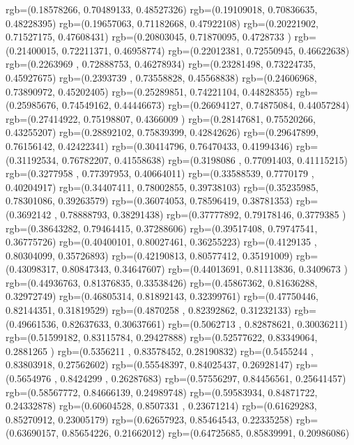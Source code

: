 {{{		  rgb=(0.18578266,  0.70489133,  0.48527326)
		  rgb=(0.19109018,  0.70836635,  0.48228395)
		  rgb=(0.19657063,  0.71182668,  0.47922108)
		  rgb=(0.20221902,  0.71527175,  0.47608431)
		  rgb=(0.20803045,  0.71870095,  0.4728733 )
		  rgb=(0.21400015,  0.72211371,  0.46958774)
		  rgb=(0.22012381,  0.72550945,  0.46622638)
		  rgb=(0.2263969 ,  0.72888753,  0.46278934)
		  rgb=(0.23281498,  0.73224735,  0.45927675)
		  rgb=(0.2393739 ,  0.73558828,  0.45568838)
		  rgb=(0.24606968,  0.73890972,  0.45202405)
		  rgb=(0.25289851,  0.74221104,  0.44828355)
		  rgb=(0.25985676,  0.74549162,  0.44446673)
		  rgb=(0.26694127,  0.74875084,  0.44057284)
		  rgb=(0.27414922,  0.75198807,  0.4366009 )
		  rgb=(0.28147681,  0.75520266,  0.43255207)
		  rgb=(0.28892102,  0.75839399,  0.42842626)
		  rgb=(0.29647899,  0.76156142,  0.42422341)
		  rgb=(0.30414796,  0.76470433,  0.41994346)
		  rgb=(0.31192534,  0.76782207,  0.41558638)
		  rgb=(0.3198086 ,  0.77091403,  0.41115215)
		  rgb=(0.3277958 ,  0.77397953,  0.40664011)
		  rgb=(0.33588539,  0.7770179 ,  0.40204917)
		  rgb=(0.34407411,  0.78002855,  0.39738103)
		  rgb=(0.35235985,  0.78301086,  0.39263579)
		  rgb=(0.36074053,  0.78596419,  0.38781353)
		  rgb=(0.3692142 ,  0.78888793,  0.38291438)
		  rgb=(0.37777892,  0.79178146,  0.3779385 )
		  rgb=(0.38643282,  0.79464415,  0.37288606)
		  rgb=(0.39517408,  0.79747541,  0.36775726)
		  rgb=(0.40400101,  0.80027461,  0.36255223)
		  rgb=(0.4129135 ,  0.80304099,  0.35726893)
		  rgb=(0.42190813,  0.80577412,  0.35191009)
		  rgb=(0.43098317,  0.80847343,  0.34647607)
		  rgb=(0.44013691,  0.81113836,  0.3409673 )
		  rgb=(0.44936763,  0.81376835,  0.33538426)
		  rgb=(0.45867362,  0.81636288,  0.32972749)
		  rgb=(0.46805314,  0.81892143,  0.32399761)
		  rgb=(0.47750446,  0.82144351,  0.31819529)
		  rgb=(0.4870258 ,  0.82392862,  0.31232133)
		  rgb=(0.49661536,  0.82637633,  0.30637661)
		  rgb=(0.5062713 ,  0.82878621,  0.30036211)
		  rgb=(0.51599182,  0.83115784,  0.29427888)
		  rgb=(0.52577622,  0.83349064,  0.2881265 )
		  rgb=(0.5356211 ,  0.83578452,  0.28190832)
		  rgb=(0.5455244 ,  0.83803918,  0.27562602)
		  rgb=(0.55548397,  0.84025437,  0.26928147)
		  rgb=(0.5654976 ,  0.8424299 ,  0.26287683)
		  rgb=(0.57556297,  0.84456561,  0.25641457)
		  rgb=(0.58567772,  0.84666139,  0.24989748)
		  rgb=(0.59583934,  0.84871722,  0.24332878)
		  rgb=(0.60604528,  0.8507331 ,  0.23671214)
		  rgb=(0.61629283,  0.85270912,  0.23005179)
		  rgb=(0.62657923,  0.85464543,  0.22335258)
		  rgb=(0.63690157,  0.85654226,  0.21662012)
		  rgb=(0.64725685,  0.85839991,  0.20986086)
}}}
